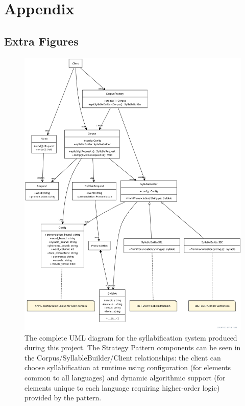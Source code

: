 \documentclass[11pt]{article}
\begin{document}
\newpage
\section{Appendix}
\subsection{Extra Figures}
\begin{figure}[h]
  \centering
  \includegraphics[scale=0.3]{UMLdiag.png}
  \caption{The complete UML diagram for the syllabification system produced during this project. The Strategy Pattern components can be seen in the Corpus/SyllableBuilder/Client relationships: the client can choose syllabification at runtime using configuration (for elements common to all languages) and dynamic algorithmic support (for elements unique to each language requiring higher-order logic) provided by the pattern.}
  \label{fig:UMLdiag}
\end{figure}

\newpage

\vskip 0.2in

\end{document}
